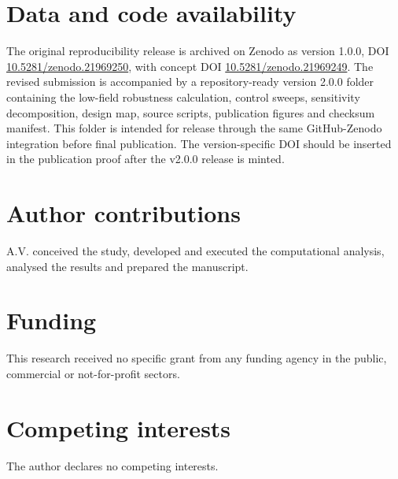 \documentclass[11pt]{article}
\begin{document}
\section*{Data and code availability}
The original reproducibility release is archived on Zenodo as version 1.0.0, DOI \href{https://doi.org/10.5281/zenodo.21969250}{10.5281/zenodo.21969250}, with concept DOI \href{https://doi.org/10.5281/zenodo.21969249}{10.5281/zenodo.21969249}. The revised submission is accompanied by a repository-ready version 2.0.0 folder containing the low-field robustness calculation, control sweeps, sensitivity decomposition, design map, source scripts, publication figures and checksum manifest. This folder is intended for release through the same GitHub-Zenodo integration before final publication. The version-specific DOI should be inserted in the publication proof after the v2.0.0 release is minted.

\section*{Author contributions}
A.V. conceived the study, developed and executed the computational analysis, analysed the results and prepared the manuscript.

\section*{Funding}
This research received no specific grant from any funding agency in the public, commercial or not-for-profit sectors.

\section*{Competing interests}
The author declares no competing interests.
\end{document}
